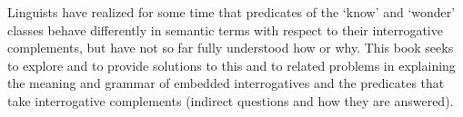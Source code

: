Linguists have realized for some time that predicates of the `know' and `wonder' classes behave differently in semantic terms with respect to their interrogative complements, but have not so far fully understood how or why. This book seeks to explore and to provide solutions to this and to related problems in explaining the meaning and grammar of embedded interrogatives and the predicates that take interrogative complements (indirect questions and how they are answered).
\endinput